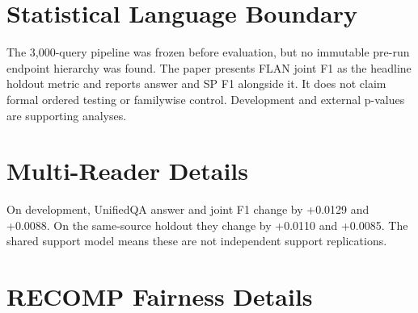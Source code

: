 \begin{table}[t]
\centering
\small
\caption{Selector fold configurations and outcomes.}
\label{tab:app-2}
\end{table}

\section{Statistical Language Boundary}

The 3,000-query pipeline was frozen before evaluation, but no immutable pre-run endpoint hierarchy was found. The paper presents FLAN joint F1 as the headline holdout metric and reports answer and SP F1 alongside it. It does not claim formal ordered testing or familywise control. Development and external p-values are supporting analyses.

\section{Multi-Reader Details}

On development, UnifiedQA answer and joint F1 change by +0.0129 and +0.0088. On the same-source holdout they change by +0.0110 and +0.0085. The shared support model means these are not independent support replications.

\section{RECOMP Fairness Details}

